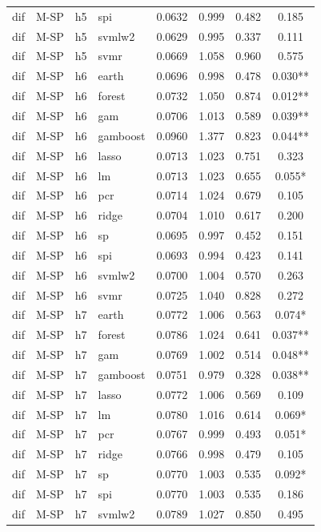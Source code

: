 \begin{ThreePartTable}
\begin{longtable}[t]{llclcccc}
dif & M-SP & h5 & spi & 0.0632 & 0.999 & 0.482 & 0.185\\
dif & M-SP & h5 & svmlw2 & 0.0629 & 0.995 & 0.337 & 0.111\\
dif & M-SP & h5 & svmr & 0.0669 & 1.058 & 0.960 & 0.575\\
\addlinespace
dif & M-SP & h6 & earth & 0.0696 & 0.998 & 0.478 & 0.030**\\
dif & M-SP & h6 & forest & 0.0732 & 1.050 & 0.874 & 0.012**\\
dif & M-SP & h6 & gam & 0.0706 & 1.013 & 0.589 & 0.039**\\
dif & M-SP & h6 & gamboost & 0.0960 & 1.377 & 0.823 & 0.044**\\
dif & M-SP & h6 & lasso & 0.0713 & 1.023 & 0.751 & 0.323\\
dif & M-SP & h6 & lm & 0.0713 & 1.023 & 0.655 & 0.055*\\
dif & M-SP & h6 & pcr & 0.0714 & 1.024 & 0.679 & 0.105\\
dif & M-SP & h6 & ridge & 0.0704 & 1.010 & 0.617 & 0.200\\
dif & M-SP & h6 & sp & 0.0695 & 0.997 & 0.452 & 0.151\\
dif & M-SP & h6 & spi & 0.0693 & 0.994 & 0.423 & 0.141\\
dif & M-SP & h6 & svmlw2 & 0.0700 & 1.004 & 0.570 & 0.263\\
dif & M-SP & h6 & svmr & 0.0725 & 1.040 & 0.828 & 0.272\\
\addlinespace
dif & M-SP & h7 & earth & 0.0772 & 1.006 & 0.563 & 0.074*\\
dif & M-SP & h7 & forest & 0.0786 & 1.024 & 0.641 & 0.037**\\
dif & M-SP & h7 & gam & 0.0769 & 1.002 & 0.514 & 0.048**\\
dif & M-SP & h7 & gamboost & 0.0751 & 0.979 & 0.328 & 0.038**\\
dif & M-SP & h7 & lasso & 0.0772 & 1.006 & 0.569 & 0.109\\
dif & M-SP & h7 & lm & 0.0780 & 1.016 & 0.614 & 0.069*\\
dif & M-SP & h7 & pcr & 0.0767 & 0.999 & 0.493 & 0.051*\\
dif & M-SP & h7 & ridge & 0.0766 & 0.998 & 0.479 & 0.105\\
dif & M-SP & h7 & sp & 0.0770 & 1.003 & 0.535 & 0.092*\\
dif & M-SP & h7 & spi & 0.0770 & 1.003 & 0.535 & 0.186\\
dif & M-SP & h7 & svmlw2 & 0.0789 & 1.027 & 0.850 & 0.495\\

\end{longtable}
\end{ThreePartTable}
